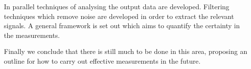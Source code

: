 In parallel techniques of analysing the output data are developed. Filtering techniques which remove noise are developed in order to extract the relevant signals. A general framework is set out which aims to quantify the certainty in the measurements.

Finally we conclude that there is still much to be done in this area, proposing an outline for how to carry out effective measurements in the future.


